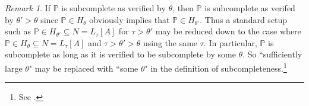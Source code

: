 \documentclass{amsart}
\theoremstyle{definition}
\theoremstyle{remark}
\newtheorem{remark}[theorem]{Remark}
\renewcommand{\P}{\mathbb{P}}
\newcommand{\N}{{\overline{N}}}
\newcommand{\G}{\overline{G}}
\newcommand{\id}{\textup{\ensuremath{\text{id}}}}
\DeclareMathOperator{\ran}{range}
\newcommand{\rest}{\mathbin{\upharpoonright}}
\newcommand{\SH}{\mathcal{H}\textit{ull} \,}
\newcommand{\sk}[3]{\SH^{#1}( {#2} \cup {\ran(#3)} ) }
\newcommand{\Sk}[3]{\SH^{#1}( {#2} \cup {#3} ) }
\begin{document}
%

\begin{remark}\label{remark:VerifyingSC} If $\P$ is subcomplete as verified by $\theta$, then $\P$ is subcomplete as verifed by $\theta' > \theta$ since $\P \in H_\theta$ obviously implies that $\P \in H_{\theta'}$. Thus a standard setup such as $\P \in H_{\theta'} \subseteq N=L_\tau[A]$ for $\tau>\theta'$ may be reduced down to the case where $\P \in H_{\theta} \subseteq N=L_\tau[A]$ and $\tau>\theta'>\theta$ using the same $\tau$. In particular, $\P$ is subcomplete as long as it is verified to be subcomplete by some $\theta$. So ``sufficiently large $\theta$" may be replaced with ``some $\theta$" in the definition of subcompleteness.\footnote{See \cite[Section 3.1 Lemma 2.4]{Jensen:2012fr}.} \end{remark}
\end{document}

